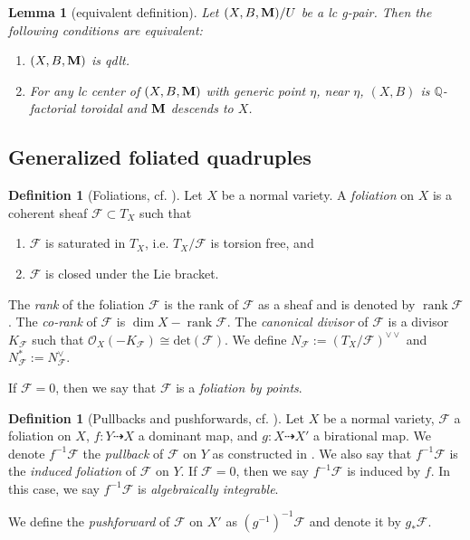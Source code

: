 \documentclass[11pt]{amsart}
\numberwithin{equation}{section}
\newcommand{\Mm}{{\bf{M}}}
\newcommand{\Qq}{\mathbb{Q}}
\newcommand{\rk}{\operatorname{rank}}
\newcommand{\Ff}{\mathcal{F}}
\newtheorem{lem}[thm]{Lemma}
\theoremstyle{definition}
\newtheorem{defn}[thm]{Definition}
\theoremstyle{definition}
\theoremstyle{definition}
\begin{document}
\begin{lem}[equivalent definition]\label{lem: equi def qdlt}
    Let $(X,B,\Mm)/U$ be a lc g-pair. Then the following conditions are equivalent:
    \begin{enumerate}
        \item $(X,B,\Mm)$ is qdlt.
        \item For any lc center of $(X,B,\Mm)$ with generic point $\eta$, near $\eta$, $(X,B)$ is $\Qq$-factorial toroidal and $\Mm$ descends to $X$.
    \end{enumerate}
\end{lem}




\subsection{Generalized foliated quadruples}

\begin{defn}[Foliations, {cf. \cite[Section 2.1]{CS21}}]\label{defn: foliation}
Let $X$ be a normal variety. A \emph{foliation} on $X$ is a coherent sheaf $\Ff\subset T_X$ such that
\begin{enumerate}
    \item $\Ff$ is saturated in $T_X$, i.e. $T_X/\Ff$ is torsion free, and
    \item $\Ff$ is closed under the Lie bracket.
\end{enumerate}
The \emph{rank} of the foliation $\Ff$ is the rank of $\Ff$ as a sheaf and is denoted by $\rk\Ff$. The \emph{co-rank} of $\Ff$ is $\dim X-\rk\Ff$. The \emph{canonical divisor} of $\Ff$ is a divisor $K_\Ff$ such that $\mathcal{O}_X(-K_{\mathcal{F}})\cong\mathrm{det}(\Ff)$. We define $N_{\Ff}:=(T_X/\Ff)^{\vee\vee}$ and $N_{\Ff}^*:=N_{\Ff}^{\vee}$.

If $\Ff=0$, then we say that $\Ff$ is a \emph{foliation by points}.
\end{defn}

\begin{defn}[Pullbacks and pushforwards, {cf. \cite[3.1]{ACSS21}}]\label{defn: pullback}
Let $X$ be a normal variety, $\Ff$ a foliation on $X$, $f: Y\dashrightarrow X$ a dominant map, and $g: X\dashrightarrow X'$ a birational map. We denote $f^{-1}\Ff$ the \emph{pullback} of $\Ff$ on $Y$ as constructed in \cite[3.2]{Dru21}. We also say that $f^{-1}\Ff$ is the \emph{induced foliation} of $\Ff$ on $Y$. If $\Ff=0$, then we say $f^{-1}\Ff$ is induced by $f$. In this case, we say $f^{-1}\Ff$ is \emph{algebraically integrable}.

We define the \emph{pushforward} of $\Ff$ on $X'$ as $(g^{-1})^{-1}\Ff$ and denote it by $g_*\Ff$.
\end{defn}
\end{document}
